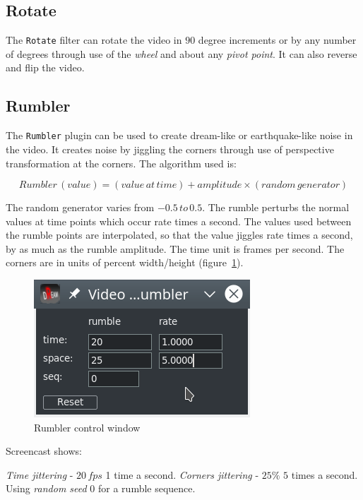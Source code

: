 \subsection{Rotate}%
\label{sub:rotate}

The \texttt{Rotate} filter can rotate the video in $90$ degree increments or by any number of degrees through use of the \textit{wheel} and about any \textit{pivot point}. It can also reverse and flip the video.

\subsection{Rumbler}%
\label{sub:rumbler}

The \texttt{Rumbler} plugin can be used to create dream-like or earthquake-like noise in the video. It creates noise by jiggling the corners through use of perspective transformation at the corners. The algorithm used is:

\[Rumbler\,(value) = (value\, at\, time) + amplitude \times (random\, generator)\]

The random generator varies from $-0.5\, to\, 0.5$. The rumble perturbs the normal values at time points which occur rate times a second. The values used between the rumble points are interpolated, so that the value jiggles rate times a second, by as much as the rumble amplitude. The time unit is frames per second. The corners are in units of percent width/height (figure~\ref{fig:rumbler}).

\begin{figure}[hbtp]
    \centering
    \includegraphics[width=0.6\linewidth]{images/rumbler.png}
    \caption{Rumbler control window}
    \label{fig:rumbler}
\end{figure}

Screencast shows:

\textit{Time jittering} - $20\, fps$ 1 time a second.
\textit{Corners jittering} - $25\%$  $5$ times a second.
Using \textit{random seed} $0$ for a rumble sequence.

